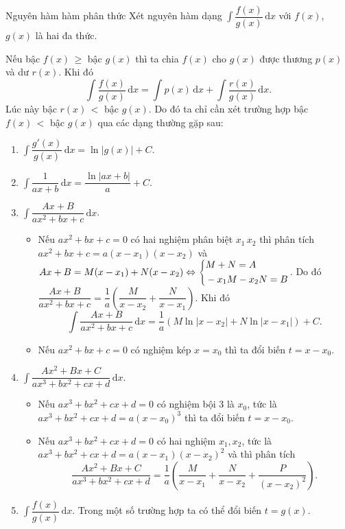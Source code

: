 \begin{dang}{Nguyên hàm hàm phân thức}
Xét nguyên hàm dạng $\displaystyle\int \dfrac{f(x)}{g(x)}\mathrm{\,d}x$ với $f(x)$, $g(x)$ là hai đa thức.

Nếu bậc $f(x)\,\ge $ bậc $g(x)$ thì ta chia $f(x)$ cho $g(x)$ được thương $p(x)$ và dư $r(x)$. Khi đó
$$\displaystyle\int \dfrac{f(x)}{g(x)}\mathrm{\,d}x=\displaystyle\int p(x) \mathrm{\,d}x+\displaystyle\int \dfrac{r(x)}{g(x)}\mathrm{\,d}x.$$	
Lúc này bậc $r(x)\,<$ bậc $g(x)$. Do đó ta chỉ cần xét trường hợp bậc $f(x)\,<$ bậc $g(x)$ qua các dạng thường gặp sau:
\begin{enumerate}[Dạng 1:]
	\item  $\displaystyle \int \dfrac{g'(x)}{g(x)}\mathrm{\,d}x=\ln |g(x)|+C.$
	\item  $\displaystyle \int \dfrac{1}{ax+b}\mathrm{\,d}x=\dfrac{\ln|ax+b|}{a}+C.$
	\item  $\displaystyle \int \dfrac{Ax+B}{ax^2+bx+c}\mathrm{\,d}x$.
		\begin{itemize}
			\item Nếu $ax^2+bx+c=0$ có hai nghiệm phân biệt $x_1\,x_2$ thì phân tích $ax^2+bx+c=a(x-x_1)(x-x_2)$ và $Ax+B=M(x-x_1)+N(x-x_2) \Leftrightarrow \left\{\begin{aligned}&M+N=A\\ &-x_1M-x_2N=B\end{aligned}\right.$. Do đó $\dfrac{Ax+B}{ax^2+bx+c}=\dfrac{1}{a}\left(\dfrac{M}{x-x_2}+\dfrac{N}{x-x_1}\right)$. Khi đó 
			$$\displaystyle\int \dfrac{Ax+B}{ax^2+bx+c}\mathrm{\,d}x=\dfrac{1}{a}\left(M\ln |x-x_2|+N\ln|x-x_1|\right)+C.$$
			\item Nếu $ax^2+bx+c=0$ có nghiệm kép $x=x_0$ thì ta đổi biến $t=x-x_0$.
		\end{itemize}
	\item $\displaystyle \int \dfrac{Ax^2+Bx+C}{ax^3+bx^2+cx+d}\mathrm{\,d}x$.
		\begin{itemize}
			\item Nếu $ax^3+bx^2+cx+d=0$ có nghiệm bội $3$ là $x_0$, tức là $ax^3+bx^2+cx+d=a(x-x_0)^3$ thì ta đổi biến $t=x-x_0$.
			\item Nếu $ax^3+bx^2+cx+d=0$ có hai nghiệm $x_1, x_2$, tức là $ax^3+bx^2+cx+d=a(x-x_1)(x-x_2)^2$ và thì phân tích
			$$\dfrac{Ax^2+Bx+C}{ax^3+bx^2+cx+d}=\dfrac{1}{a}\left(\dfrac{M}{x-x_1}+\dfrac{N}{x-x_2}+\dfrac{P}{(x-x_2)^2}\right).$$
		\end{itemize}
	\item  $\displaystyle\int \dfrac{f(x)}{g(x)}\mathrm{\,d}x$. Trong một số trường hợp ta có thể đổi biến $t=g(x)$.
\end{enumerate}
\end{dang}

